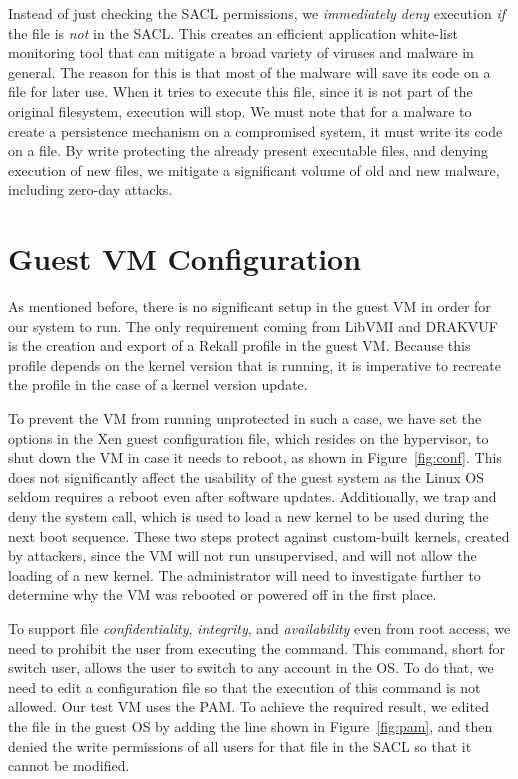 \par Instead of just checking the \ac{SACL} permissions, we \emph{immediately deny} execution \emph{if} the file is \emph{not} in the \ac{SACL}. This creates an efficient application white-list monitoring tool that can mitigate a broad variety of viruses and malware in general. The reason for this is that most of the malware will save its code on a file for later use. When it tries to execute this file, since it is not part of the original filesystem, execution will stop. We must note that for a malware to create a persistence mechanism on a compromised system, it must write its code on a file. By write protecting the already present executable files, and denying execution of new files, we mitigate a significant volume of old and new malware, including zero-day attacks.



\section{Guest \ac{VM} Configuration}\label{sub:conf}

As mentioned before, there is no significant setup in the guest \ac{VM} in order for our system to run. The only requirement coming from LibVMI and DRAKVUF is the creation and export of a Rekall profile in the guest \ac{VM}. Because this profile depends on the kernel version that is running, it is imperative to recreate the profile in the case of a kernel version update. 

\par To prevent the \ac{VM} from running unprotected in such a case, we have set the options in the Xen guest configuration file, which resides on the hypervisor, to shut down the \ac{VM} in case it needs to reboot, as shown in Figure~\ref{fig:conf}. This does not significantly affect the usability of the guest system as the Linux \ac{OS} seldom requires a reboot even after software updates. Additionally, we trap and deny the  system call, which is used to load a new kernel to be used during the next boot sequence. These two steps protect against custom-built kernels, created by attackers, since the \ac{VM} will not run unsupervised, and will not allow the loading of a new kernel. The administrator will need to investigate further to determine why the \ac{VM} was rebooted or powered off in the first place.

\par To support file \emph{confidentiality}, \emph{integrity}, and \emph{availability} even from root access, we need to prohibit the  user from executing the  command. This command, short for switch user, allows the  user to switch to any account in the \ac{OS}. To do that, we need to edit a configuration file so that the execution of this command is not allowed. Our test \ac{VM} uses the \ac{PAM}. To achieve the required result, we edited the  file in the guest \ac{OS} by adding the line shown in Figure~\ref{fig:pam}, and then denied the write permissions of all users for that file in the \ac{SACL} so that it cannot be modified.

